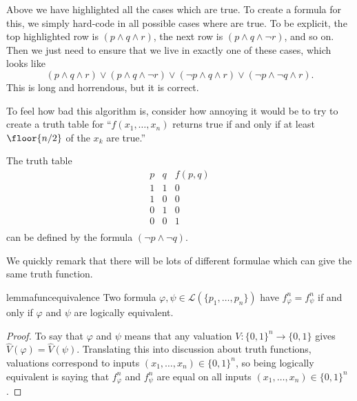 Above we have highlighted all the cases which are true. To create a formula for this, we simply hard-code in all possible cases where are true. To be explicit, the top highlighted row is $(p\land q\land r)$, the next row is $(p\land q\land\lnot r)$, and so on. Then we just need to ensure that we live in exactly one of these cases, which looks like
\[(p\land q\land r)\lor(p\land q\land\lnot r)\lor(\lnot p\land q\land r)\lor(\lnot p\land\lnot q\land r).\]
This is long and horrendous, but it is correct.
\begin{remark}
	To feel how bad this algorithm is, consider how annoying it would be to try to create a truth table for ``$f(x_1,\ldots,x_n)$ returns true if and only if at least $\floor{n/2}$ of the $x_k$ are true.''
\end{remark}
\begin{example}
	The truth table
	\[\begin{array}{c|c||c}
		p & q & f(p,q) \\
		\hline
		1 & 1 & 0 \\
		1 & 0 & 0 \\
		0 & 1 & 0 \\
		0 & 0 & 1 \\
	\end{array}\]
	can be defined by the formula $(\lnot p\land\lnot q)$.
\end{example}
We quickly remark that there will be lots of different formulae which can give the same truth function.
\begin{restatable}{lemma}{funcequivalence}
	Two formula $\varphi,\psi\in\mathcal L(\{p_1,\ldots,p_n\})$ have $f^n_\varphi=f^n_\psi$ if and only if $\varphi$ and $\psi$ are logically equivalent.
\end{restatable}
\begin{proof}
	To say that $\varphi$ and $\psi$ means that any valuation $V:\{0,1\}^n\to\{0,1\}$ gives $\hat V(\varphi)=\hat V(\psi)$. Translating this into discussion about truth functions, valuations correspond to inputs $(x_1,\ldots,x_n)\in\{0,1\}^n$, so being logically equivalent is saying that $f^n_\varphi$ and $f^n_\psi$ are equal on all inputs $(x_1,\ldots,x_n)\in\{0,1\}^n$.
\end{proof}